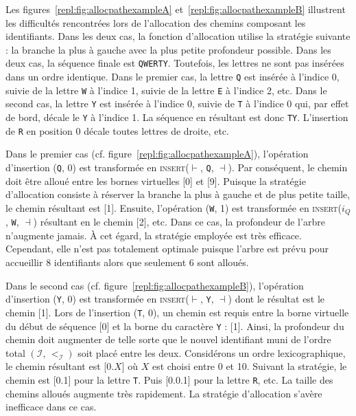 Les figures~\ref{repl:fig:allocpathexampleA} et~\ref{repl:fig:allocpathexampleB}
illustrent les difficultés rencontrées lors de l'allocation des chemins
composant les identifiants. Dans les deux cas, la fonction d'allocation utilise
la stratégie suivante : la branche la plus à gauche avec la plus petite
profondeur possible. Dans les deux cas, la séquence finale est
\texttt{QWERTY}. Toutefois, les lettres ne sont pas insérées dans un ordre
identique. Dans le premier cas, la lettre \texttt{Q} est insérée à l'indice 0,
suivie de la lettre \texttt{W} à l'indice 1, suivie de la lettre \texttt{E} à
l'indice 2, etc.  Dans le second cas, la lettre \texttt{Y} est insérée à
l'indice 0, suivie de \texttt{T} à l'indice 0 qui, par effet de bord, décale le
\texttt{Y} à l'indice 1. La séquence en résultant est donc
\texttt{TY}. L'insertion de \texttt{R} en position 0 décale toutes lettres de
droite, etc.

Dans le premier cas (cf. figure~\ref{repl:fig:allocpathexampleA}), l'opération
d'insertion (\texttt{Q}, 0) est transformée en \textsc{insert}($\vdash$,
\texttt{Q}, $\dashv$). Par conséquent, le chemin doit être alloué entre les
bornes virtuelles [0] et [9]. Puisque la stratégie d'allocation consiste à
réserver la branche la plus à gauche et de plus petite taille, le chemin
résultant est [1]. Ensuite, l'opération (\texttt{W}, 1) est transformée en
\textsc{insert}($i_Q$, \texttt{W}, $\dashv$) résultant en le chemin [2], etc.
Dans ce cas, la profondeur de l'arbre n'augmente jamais. À cet égard, la
stratégie employée est très efficace. Cependant, elle n'est pas totalement
optimale puisque l'arbre est prévu pour accueillir 8 identifiants alors que
seulement 6 sont alloués.

Dans le second cas (cf. figure~\ref{repl:fig:allocpathexampleB}), l'opération
d'insertion (\texttt{Y}, 0) est transformée en \textsc{insert}($\vdash$,
\texttt{Y}, $\dashv$) dont le résultat est le chemin [1]. Lors de l'insertion
(\texttt{T}, 0), un chemin est requis entre la borne virtuelle du début de
séquence [0] et la borne du caractère \texttt{Y} : [1]. Ainsi, la profondeur du
chemin doit augmenter de telle sorte que le nouvel identifiant muni de l'ordre
total $(\mathcal{I},\,<_\mathcal{I})$ soit placé entre les deux. Considérons un
ordre lexicographique, le chemin résultant est [0.$X$] où $X$ est choisi entre 0
et 10. Suivant la stratégie, le chemin est [0.1] pour la lettre \texttt{T}. Puis
[0.0.1] pour la lettre \texttt{R}, etc. La taille des chemins alloués augmente
très rapidement.  La stratégie d'allocation s'avère inefficace dans ce cas.

